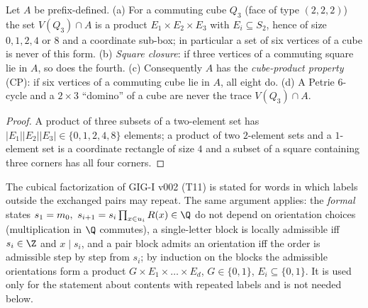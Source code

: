 \begin{corollary}\label{cor:CP}
Let $A$ be prefix-defined. (a) For a commuting cube $Q_3$ (face of type $(2,2,2)$) the set $V(Q_3)\cap A$ is a product $E_1\times E_2\times E_3$ with $E_i\subseteq S_2$, hence of size $0,1,2,4$ or $8$ and a coordinate sub-box; in particular a set of six vertices of a cube is never of this form. (b) \emph{Square closure}: if three vertices of a commuting square lie in $A$, so does the fourth. (c) Consequently $A$ has the \emph{cube-product property} (CP): if six vertices of a commuting cube lie in $A$, all eight do. (d) A Petrie $6$-cycle and a $2\times3$ ``domino'' of a cube are never the trace $V(Q_3)\cap A$.
\end{corollary}
\begin{proof}
A product of three subsets of a two-element set has $|E_1||E_2||E_3|\in\{0,1,2,4,8\}$ elements; a product of two $2$-element sets and a $1$-element set is a coordinate rectangle of size $4$ and a subset of a square containing three corners has all four corners.
\end{proof}
\begin{remark}\label{rem:T11}
The cubical factorization of GIG-I v002 (T11) is stated for words in which labels outside the exchanged pairs may repeat. The same argument applies: the \emph{formal} states $s_1=m_0,\ s_{i+1}=s_i\prod_{x\in u_i}R(x)\in\Q$ do not depend on orientation choices (multiplication in $\Q$ commutes), a single-letter block is locally admissible iff $s_i\in\Z$ and $x\mid s_i$, and a pair block admits an orientation iff the order is admissible step by step from $s_i$; by induction on the blocks the admissible orientations form a product $G\times E_1\times\dots\times E_d$, $G\in\{0,1\}$, $E_i\subseteq\{0,1\}$. It is used only for the statement about contents with repeated labels and is not needed below.
\end{remark}

